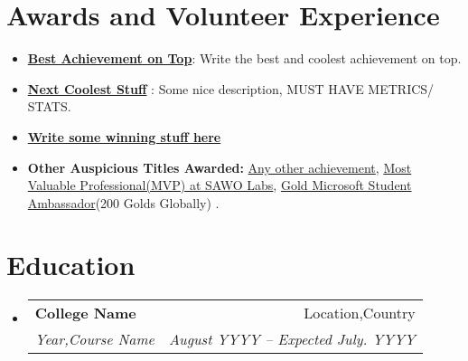 \documentclass[letterpaper,11pt]{article}
\makeatletter
\newcommand{\resumeItem}[1]{
  \item\small{
    {#1 \vspace{-2pt}}
  }
}
\newcommand{\resumeSubheading}[4]{
  \vspace{-2pt}\item
    \begin{tabular*}{0.97\textwidth}[t]{l@{\extracolsep{\fill}}r}
      \textbf{#1} & #2 \\
      \textit{\small#3} & \textit{\small #4} \\
    \end{tabular*}\vspace{-7pt}
}
\newcommand{\resumeSubHeadingListStart}{\begin{itemize}[leftmargin=0.15in, label={}]}
\newcommand{\resumeSubHeadingListEnd}{\end{itemize}}
\newcommand{\resumeItemListStart}{\begin{itemize}}
\newcommand{\resumeItemListEnd}{\end{itemize}\vspace{-5pt}}
\makeatother
\begin{document}
\section{Awards and Volunteer Experience }
 \begin{itemize}[leftmargin=0.15in, label={}]
    \small{\item{
        \resumeItemListStart
                \resumeItem{\textbf{\href{Link if any}{Best Achievement on Top}}: Write the best and coolest achievement on top.}
                \resumeItem{\textbf{\href{https://apihacks.co}{Next Coolest Stuff} }: Some nice description, MUST HAVE METRICS/ STATS.}
                \resumeItem{\textbf{\href{https://devpost.com/software/cryptodrive}{Write some winning stuff here}}}
                \resumeItem{\textbf{Other Auspicious Titles Awarded:} \href{Any relevant link}{Any other achievement},  \href{https://twitter.com/SawoLabs/status/1418869910332055552}{Most Valuable Professional(MVP) at SAWO Labs}, \href{https://studentambassadors.microsoft.com/en-US/profile/49532}{Gold Microsoft Student Ambassador}(200 Golds Globally) .}
      \resumeItemListEnd
    }}
 \end{itemize}
 
\section{Education}
  \resumeSubHeadingListStart
    \resumeSubheading
      {College Name}{Location,Country}
      {Year,Course Name}{August YYYY -- Expected July. YYYY}
  \resumeSubHeadingListEnd
\end{document}
